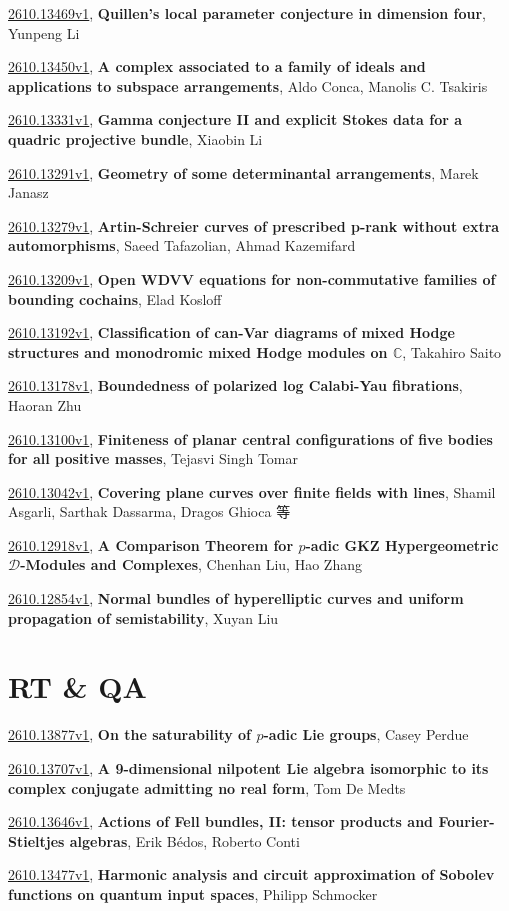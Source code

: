 \documentclass[9pt, a4paper]{article}
\theoremstyle{plain}
\theoremstyle{definition}
\theoremstyle{remark}
\newcommand{\arxiv}[3]{\href{https://arxiv.org/abs/#1}{#1}, \textbf{\textcolor{arxivblue}{#2}}, #3}
\begin{document}
\arxiv{2610.13469v1}{Quillen's local parameter conjecture in dimension four}{Yunpeng Li}

\arxiv{2610.13450v1}{A complex associated to a family of ideals and applications to subspace arrangements}{Aldo Conca, Manolis C. Tsakiris}

\arxiv{2610.13331v1}{Gamma conjecture II and explicit Stokes data for a quadric projective bundle}{Xiaobin Li}

\arxiv{2610.13291v1}{Geometry of some determinantal arrangements}{Marek Janasz}

\arxiv{2610.13279v1}{Artin-Schreier curves of prescribed p-rank without extra automorphisms}{Saeed Tafazolian, Ahmad Kazemifard}

\arxiv{2610.13209v1}{Open WDVV equations for non-commutative families of bounding cochains}{Elad Kosloff}

\arxiv{2610.13192v1}{Classification of can-Var diagrams of mixed Hodge structures and monodromic mixed Hodge modules on $\mathbb{C}$}{Takahiro Saito}

\arxiv{2610.13178v1}{Boundedness of polarized log Calabi-Yau fibrations}{Haoran Zhu}

\arxiv{2610.13100v1}{Finiteness of planar central configurations of five bodies for all positive masses}{Tejasvi Singh Tomar}

\arxiv{2610.13042v1}{Covering plane curves over finite fields with lines}{Shamil Asgarli, Sarthak Dassarma, Dragos Ghioca 等}

\arxiv{2610.12918v1}{A Comparison Theorem for $p$-adic GKZ Hypergeometric $\mathcal D$-Modules and Complexes}{Chenhan Liu, Hao Zhang}

\arxiv{2610.12854v1}{Normal bundles of hyperelliptic curves and uniform propagation of semistability}{Xuyan Liu}


\section{RT \& QA}
\arxiv{2610.13877v1}{On the saturability of $p$-adic Lie groups}{Casey Perdue}

\arxiv{2610.13707v1}{A 9-dimensional nilpotent Lie algebra isomorphic to its complex conjugate admitting no real form}{Tom De Medts}

\arxiv{2610.13646v1}{Actions of Fell bundles, II: tensor products and Fourier-Stieltjes algebras}{Erik Bédos, Roberto Conti}

\arxiv{2610.13477v1}{Harmonic analysis and circuit approximation of Sobolev functions on quantum input spaces}{Philipp Schmocker}
\end{document}
